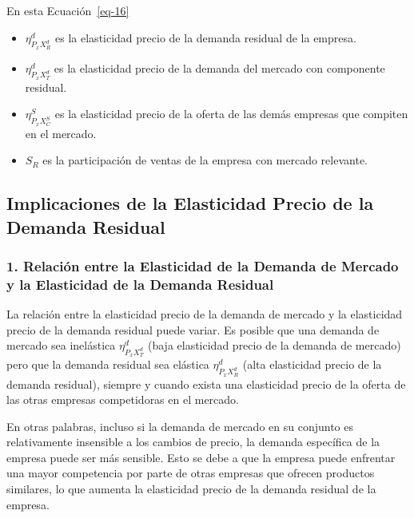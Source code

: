 \documentclass[
  a4paper,
]{article}
\theoremstyle{definition}
\theoremstyle{remark}
\begin{document}
En esta Ecuación~\ref{eq-16}

\begin{itemize}
\item
  \(\eta_{P_{x}X_R^d}^d\) es la elasticidad precio de la demanda
  residual de la empresa.
\item
  \(\eta_{P_{x}X_T^d}^d\) es la elasticidad precio de la demanda del
  mercado con componente residual.
\item
  \(\eta_{P_{x}X_C^S}^S\) es la elasticidad precio de la oferta de las
  demás empresas que compiten en el mercado.
\item
  \(S_R\) es la participación de ventas de la empresa con mercado
  relevante.
\end{itemize}

\hypertarget{implicaciones-de-la-elasticidad-precio-de-la-demanda-residual}{%
\subsection{Implicaciones de la Elasticidad Precio de la Demanda
Residual}\label{implicaciones-de-la-elasticidad-precio-de-la-demanda-residual}}

\hypertarget{relaciuxf3n-entre-la-elasticidad-de-la-demanda-de-mercado-y-la-elasticidad-de-la-demanda-residual}{%
\subsubsection{1. Relación entre la Elasticidad de la Demanda de Mercado
y la Elasticidad de la Demanda
Residual}\label{relaciuxf3n-entre-la-elasticidad-de-la-demanda-de-mercado-y-la-elasticidad-de-la-demanda-residual}}

La relación entre la elasticidad precio de la demanda de mercado y la
elasticidad precio de la demanda residual puede variar. Es posible que
una demanda de mercado sea inelástica \(\eta_{P_{x}X_T^d}^d\) (baja
elasticidad precio de la demanda de mercado) pero que la demanda
residual sea elástica \(\eta_{P_{x}X_R^d}^d\) (alta elasticidad precio
de la demanda residual), siempre y cuando exista una elasticidad precio
de la oferta de las otras empresas competidoras en el mercado.

En otras palabras, incluso si la demanda de mercado en su conjunto es
relativamente insensible a los cambios de precio, la demanda específica
de la empresa puede ser más sensible. Esto se debe a que la empresa
puede enfrentar una mayor competencia por parte de otras empresas que
ofrecen productos similares, lo que aumenta la elasticidad precio de la
demanda residual de la empresa.
\end{document}
